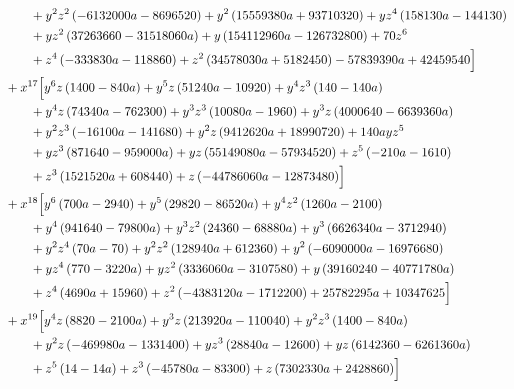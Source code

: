 \begin{align*}
&\qquad + y^{2} z^{2} \left(- 6132000 a - 8696520\right) + y^{2} \left(15559380 a + 93710320\right) + y z^{4} \left(158130 a - 144130\right)\\
&\qquad + y z^{2} \left(37263660 - 31518060 a\right) + y \left(154112960 a - 126732800\right) + 70 z^{6}\\
&\qquad + z^{4} \left(- 333830 a - 118860\right) + z^{2} \left(34578030 a + 5182450\right) - 57839390 a + 42459540\Bigr]\\
&{}+x^{17}\Bigl[y^{6} z \left(1400 - 840 a\right) + y^{5} z \left(51240 a - 10920\right) + y^{4} z^{3} \left(140 - 140 a\right)\\
&\qquad + y^{4} z \left(74340 a - 762300\right) + y^{3} z^{3} \left(10080 a - 1960\right) + y^{3} z \left(4000640 - 6639360 a\right)\\
&\qquad + y^{2} z^{3} \left(- 16100 a - 141680\right) + y^{2} z \left(9412620 a + 18990720\right) + 140 a y z^{5}\\
&\qquad + y z^{3} \left(871640 - 959000 a\right) + y z \left(55149080 a - 57934520\right) + z^{5} \left(- 210 a - 1610\right)\\
&\qquad + z^{3} \left(1521520 a + 608440\right) + z \left(- 44786060 a - 12873480\right)\Bigr]\\
&{}+x^{18}\Bigl[y^{6} \left(700 a - 2940\right) + y^{5} \left(29820 - 86520 a\right) + y^{4} z^{2} \left(1260 a - 2100\right)\\
&\qquad + y^{4} \left(941640 - 79800 a\right) + y^{3} z^{2} \left(24360 - 68880 a\right) + y^{3} \left(6626340 a - 3712940\right)\\
&\qquad + y^{2} z^{4} \left(70 a - 70\right) + y^{2} z^{2} \left(128940 a + 612360\right) + y^{2} \left(- 6090000 a - 16976680\right)\\
&\qquad + y z^{4} \left(770 - 3220 a\right) + y z^{2} \left(3336060 a - 3107580\right) + y \left(39160240 - 40771780 a\right)\\
&\qquad + z^{4} \left(4690 a + 15960\right) + z^{2} \left(- 4383120 a - 1712200\right) + 25782295 a + 10347625\Bigr]\\
&{}+x^{19}\Bigl[y^{4} z \left(8820 - 2100 a\right) + y^{3} z \left(213920 a - 110040\right) + y^{2} z^{3} \left(1400 - 840 a\right)\\
&\qquad + y^{2} z \left(- 469980 a - 1331400\right) + y z^{3} \left(28840 a - 12600\right) + y z \left(6142360 - 6261360 a\right)\\
&\qquad + z^{5} \left(14 - 14 a\right) + z^{3} \left(- 45780 a - 83300\right) + z \left(7302330 a + 2428860\right)\Bigr]\\

\end{align*}
